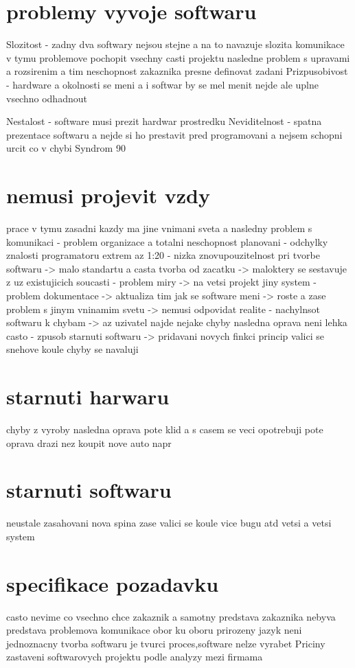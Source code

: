 \documentclass{article}
\begin{document}
\section{problemy vyvoje softwaru}
Slozitost - zadny dva softwary nejsou stejne a na to navazuje slozita komunikace v tymu
            problemove pochopit vsechny casti projektu
            nasledne problem s  upravami a rozsirenim
            a tim neschopnost zakaznika presne definovat zadani
Prizpusobivost - hardware a okolnosti se meni a i softwar by se mel menit nejde ale uplne vsechno odhadnout

Nestalost - software musi prezit hardwar prostredku
Neviditelnost - spatna prezentace softwaru a nejde si ho prestavit pred programovani
                a nejsem schopni urcit co v chybi
Syndrom 90%
\section{nemusi projevit vzdy}
prace v tymu zasadni kazdy ma jine vnimani sveta a nasledny problem s komunikaci
- problem organizace a totalni neschopnost planovani
- odchylky znalosti programatoru extrem az 1:20
- nizka znovupouzitelnost pri tvorbe softwaru
        -> malo standartu a casta tvorba od zacatku
        -> maloktery se sestavuje z uz existujicich soucasti
- problem miry
        -> na vetsi projekt jiny system
- problem dokumentace
        -> aktualiza tim jak se software meni
        -> roste a zase problem s jinym vninamim svetu
        -> nemusi odpovidat realite
- nachylnsot softwaru k chybam
-> az uzivatel najde nejake chyby nasledna oprava neni lehka casto
- zpusob starnuti softwaru
-> pridavani novych finkci princip valici se snehove koule chyby se navaluji
\section{starnuti harwaru}
chyby z vyroby nasledna oprava pote klid a s casem se veci opotrebuji pote oprava drazi nez koupit nove auto napr
\section{starnuti softwaru}
neustale zasahovani nova spina zase valici se koule vice bugu atd vetsi a vetsi system
\section{specifikace pozadavku}
casto nevime co vsechno chce zakaznik a samotny predstava zakaznika nebyva predstava
problemova komunikace obor ku oboru
prirozeny jazyk neni jednoznacny
tvorba softwaru je tvurci proces,software nelze vyrabet
Priciny zastaveni softwarovych projektu
podle analyzy mezi firmama
\end{document}

